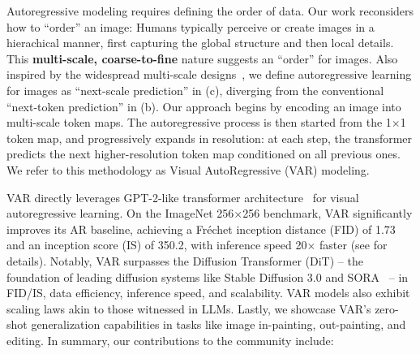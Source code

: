 Autoregressive modeling requires defining the order of data.
Our work reconsiders how to ``order'' an image:
Humans typically perceive or create images in a hierachical manner, first capturing the global structure and then local details.
This \textbf{multi-scale, coarse-to-fine} nature suggests an ``order'' for images.
Also inspired by the widespread multi-scale designs~\cite{sift,fpn,spark,pggan}, we define autoregressive learning for images as ``next-scale prediction'' in  (c), diverging from the conventional ``next-token prediction'' in  (b).
Our approach begins by encoding an image into multi-scale token maps. The autoregressive process is then started from the 1$\times$1 token map, and progressively expands in resolution: at each step, the transformer predicts the next higher-resolution token map conditioned on all previous ones.
We refer to this methodology as Visual AutoRegressive (VAR) modeling.

VAR directly leverages GPT-2-like transformer architecture~\cite{gpt2} for visual autoregressive learning.
On the ImageNet 256$\times$256 benchmark, VAR significantly improves its AR baseline, achieving a Fréchet inception distance (FID) of 1.73 and an inception score (IS) of 350.2, with inference speed 20$\times$ faster (see  for details).
Notably, VAR surpasses the Diffusion Transformer (DiT) -- the foundation of leading diffusion systems like Stable Diffusion 3.0 and SORA~\cite{stable-diffusion3,sora} -- in FID/IS, data efficiency, inference speed, and scalability.
VAR models also exhibit scaling laws akin to those witnessed in LLMs.
Lastly, we showcase VAR's zero-shot generalization capabilities in tasks like image in-painting, out-painting, and editing.
In summary, our contributions to the community include:

